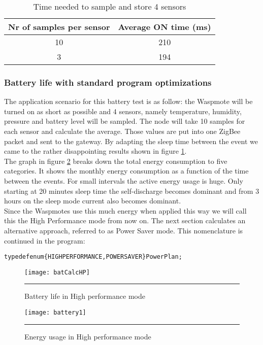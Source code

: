 \begin{table}[!ht]
\begin{center}
\begin{tabular}[!ht]{|c|c|}
\hline
\textbf{Nr of samples per sensor} & \textbf{Average ON time (ms)}\\
\hline
10 & 210\\
\hline
3 & 194\\
\hline
\end{tabular}
\caption{Time needed to sample and store 4 sensors}
\label{tab:sendTime3}
\end{center}
\end{table}
\subsubsection{Battery life with standard program optimizations}\label{batLife1}
The application scenario for this battery test is as follow: the Waspmote will be turned on as short as possible and 4 sensors, namely temperature, humidity, pressure and battery level will be sampled. The node will take 10 samples for each sensor and calculate the average. Those values are put into one ZigBee packet and sent to the gateway. By adapting the sleep time between the event we came to the rather disappointing results shown in figure \ref{fig:batCalcHP}.\\ The graph in figure \ref{fig:batCalcHP1} breaks down the total energy consumption to five categories. It shows the monthly energy consumption as a function of the time between the events. For small intervals the active energy usage is huge. Only starting at 20 minutes sleep time the self-discharge becomes dominant and from 3 hours on the sleep mode current also becomes dominant.\\
Since the Waspmotes use this much energy when applied this way we will call this the High Performance mode from now on. The next section calculates an alternative approach, referred to as Power Saver mode. This nomenclature is continued in the program:
\begin{alltt}
    typedef enum \{HIGHPERFORMANCE, POWERSAVER\} PowerPlan; 
\end{alltt}
\begin{figure}[htbp]
\centering
\texttt{[image: batCalcHP]}
\rule{30em}{0.5pt}
\caption{Battery life in High performance mode}
\label{fig:batCalcHP}
\end{figure}
\begin{figure}[htbp]
\centering
\texttt{[image: battery1]}
\rule{30em}{0.5pt}
\caption{Energy usage in High performance mode}
\label{fig:batCalcHP1}
\end{figure}
